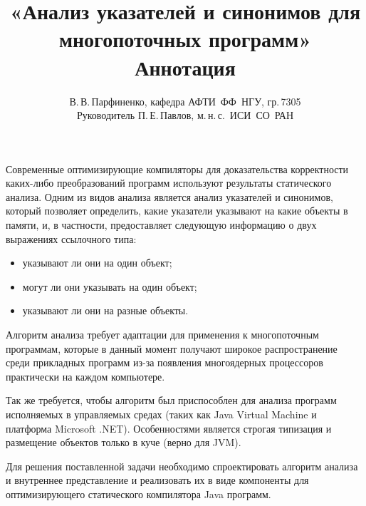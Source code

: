 \documentclass[11pt]{article}
\title{
  «Анализ указателей и синонимов для многопоточных программ»\\
  Аннотация
}
\author{
  В.\,В.\,Парфиненко, кафедра АФТИ~ФФ~НГУ, гр.\,7305\\
  Руководитель П.\,Е.\,Павлов, м.\,н.\,с.~ИСИ~СО~РАН
}
\begin{document}
  \maketitle

  \thispagestyle{empty}

    Современные оптимизирующие компиляторы для доказательства корректности
    каких-либо преобразований программ используют результаты
    статического анализа.
    Одним из видов анализа является анализ указателей и синонимов, который
    позволяет определить, какие указатели указывают на какие объекты в памяти,
    и, в частности, предоставляет следующую информацию о двух выражениях
    ссылочного типа:
    \begin{itemize}
      \item указывают ли они на один объект;
      \item могут ли они указывать на один объект;
      \item указывают ли они на разные объекты.
    \end{itemize}

    Алгоритм анализа требует адаптации для применения к многопоточным
    программам, которые в данный момент получают широкое распространение среди
    прикладных программ из-за появления многоядерных процессоров практически
    на каждом компьютере.

    Так же требуется, чтобы алгоритм был приспособлен
    для анализа программ исполняемых в управляемых средах (таких как
    Java Virtual Machine и платформа Microsoft .NET).
    Особенностями является строгая типизация и размещение объектов
    только в куче (верно для JVM).

    Для решения поставленной задачи необходимо спроектировать алгоритм
    анализа и внутреннее представление и реализовать их в виде компоненты
    для оптимизирующего статического компилятора Java программ.
\end{document}
